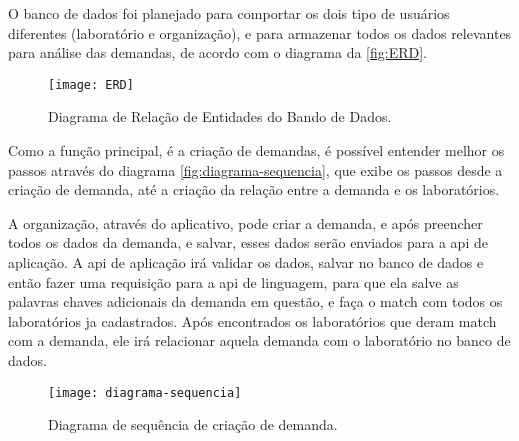 O banco de dados foi planejado para comportar os dois tipo de usuários diferentes (laboratório e organização), e para armazenar todos os dados relevantes para análise das demandas, de acordo com o diagrama da \autoref{fig:ERD}.

\begin{figure}[h!]
    \captionsetup{width=0.43\textwidth}
    \caption{Diagrama de Relação de Entidades do Bando de Dados.}
    \label{fig:ERD}
    \texttt{[image: ERD]}
    \fonte{}
\end{figure}

Como a função principal, é a criação de demandas, é possível entender melhor os passos através do diagrama \autoref{fig:diagrama-sequencia}, que exibe os passos desde a criação de demanda, até a criação da relação entre a demanda e os laboratórios.

A organização, através do aplicativo, pode criar a demanda, e após preencher todos os dados da demanda, e salvar, esses dados serão enviados para a \gls{api} de aplicação. A \gls{api} de aplicação irá validar os dados, salvar no banco de dados e então fazer uma requisição para a \gls{api} de linguagem, para que ela salve as palavras chaves adicionais da demanda em questão, e faça o match com todos os laboratórios ja cadastrados. Após encontrados os laboratórios que deram match com a demanda, ele irá relacionar aquela demanda com o laboratório no banco de dados.

\begin{figure}[htb]
    \captionsetup{width=0.43\textwidth}
    \caption{Diagrama de sequência de criação de demanda.}
    \label{fig:diagrama-sequencia}
    \texttt{[image: diagrama-sequencia]}
    \fonte{}
\end{figure}

\renewcommand{\labelenumii}{\arabic{enumi}.\arabic{enumii}}
\renewcommand{\labelenumiii}{\arabic{enumi}.\arabic{enumii}.\arabic{enumiii}}
\renewcommand{\labelenumiv}{\arabic{enumi}.\arabic{enumii}.\arabic{enumiii}.\arabic{enumiv}}

